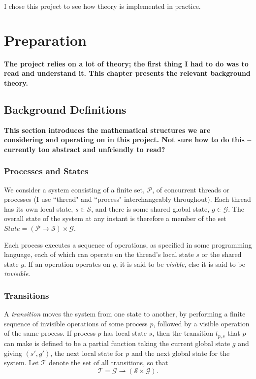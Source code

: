 \documentclass[12pt,a4paper,twoside,openright]{report}
\begin{document}
I chose this project to see how theory is
implemented in practice.

\chapter{Preparation}
\textbf{The project relies on a lot
	of theory; the first thing I had
	to do was to read and understand it.
	This chapter presents the relevant
	background theory.}

\section{Background Definitions}
\textbf{This section introduces the mathematical
	structures we are considering and operating on
	in this project.
	Not sure how to do this -- currently too
	abstract and unfriendly to read?}

\subsection{Processes and States}
We consider a system consisting of a finite set, $\mathcal{P}$,
of concurrent threads or processes (I use ``thread" and
``process" interchangeably throughout).
Each thread has its own local state, $s \in \mathcal{S}$, and there
is some shared global state, $g \in \mathcal{G}$. The overall
state of the system at any instant is therefore a member of the set
$ \textit{State} = (\mathcal{P} \to \mathcal{S}) \times \mathcal{G} $.

Each process executes a sequence of operations, as
specified in some programming language, each of which can
operate on the thread's local state $s$ or the shared
state $g$. If an operation
operates on $g$, it is said to be \emph{visible}, else it is said to be
\emph{invisible}.

\subsection{Transitions}
A \emph{transition} moves the system from one state to another,
by performing a finite sequence of invisible operations of some
process $p$, followed by a visible operation of the same process.
If process $p$ has local state $s$, then the transition $t_{p,s}$
that $p$ can make is defined to be a partial function taking the current
global state $g$ and giving $(s', g')$, the next local state for $p$
and the next global state for the system. Let $\mathcal{T}$ denote the
set of all transitions, so that
	\[\mathcal{T} = \mathcal{G} \rightharpoonup
				(\mathcal{S} \times \mathcal{G}).\]
\end{document}
